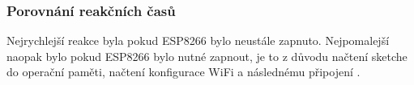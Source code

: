 \documentclass[a4paper, 12pt]{report}
\begin{document}
				\subsubsection{Porovnání reakčních časů}
					Nejrychlejší reakce byla pokud ESP8266 bylo neustále zapnuto. Nejpomalejší naopak bylo pokud ESP8266 bylo nutné zapnout, je to z důvodu načtení sketche do operační paměti, načtení konfigurace WiFi a následnému připojení .






\end{document}
